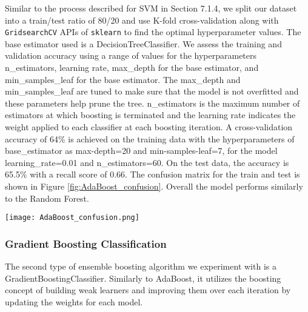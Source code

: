 \documentclass{article}
\begin{document}
Similar to the process described for SVM in Section 7.1.4, we split our dataset into a train/test ratio of 80/20 and use K-fold cross-validation along with \texttt{GridsearchCV} APIs of \texttt{sklearn} to find the optimal hyperparameter values. The base estimator used is a  DecisionTreeClassifier. We assess the training and validation accuracy using a range of values for the hyperparameters n\_estimators, learning rate, max\_depth for the base estimator, and min\_samples\_leaf for the base estimator. The max\_depth and min\_samples\_leaf are tuned to make sure that the model is not overfitted and these parameters help prune the tree. n\_estimators is the maximum number of estimators at which boosting is terminated and the learning rate indicates the weight applied to each classifier at each boosting iteration. A cross-validation accuracy of 64\% is achieved on the training data with the hyperparameters of base\_estimator as max-depth=20 and min-samples-leaf=7, for the model learning\_rate=0.01 and n\_estimators=60. On the test data, the accuracy is 65.5\% with a recall score of 0.66. The confusion matrix for the train and test is shown in Figure \ref{fig:AdaBoost_confusion}. Overall the model performs similarly to the Random Forest.   
\begin{figure*}[ht]
\centering
\texttt{[image: AdaBoost\_confusion.png]}
\caption{A confusion matrix for our AdaBoost classifier on both the train and test data.}
\label{fig:AdaBoost_confusion}
\end{figure*}

\subsubsection{Gradient Boosting Classification}
The second type of ensemble boosting algorithm we experiment with is a GradientBoostingClassifier. Similarly to AdaBoost, it utilizes the boosting concept of building weak learners and improving them over each iteration by updating the weights for each model. 
\end{document}
